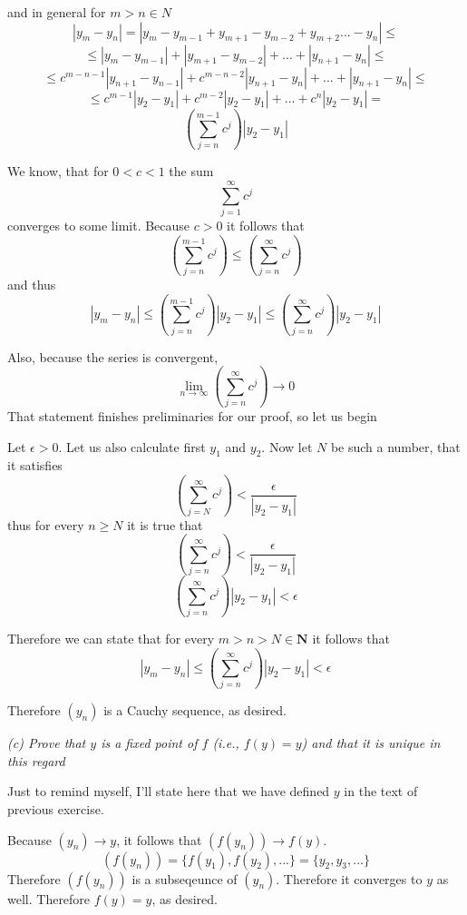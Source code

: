 \documentclass[11pt,oneside,titlepage]{book}
\begin{document}
and in general for $m > n \in N$ 
$$|y_m - y_n| = 
|y_m - y_{m - 1} + y_{m + 1} - y_{m - 2} + y_{m + 2} ...  - y_n| \leq$$
$$ \leq |y_m - y_{m - 1}| + |y_{m + 1} - y_{m - 2}| + ... +
|y_{n + 1}  - y_n| \leq $$
$$ \leq c^{m - n - 1}|y_{n + 1} - y_{n - 1}| +
c^{m - n - 2}|y_{n + 1} - y_{n}| + ... +
|y_{n + 1}  - y_n| \leq  $$
$$ \leq c^{m  - 1}|y_{2} - y_{1}| +
c^{m - 2}|y_{2} - y_{1}| + ... +
c^n|y_{2}  - y_1| =  $$
$$\left(\sum_{j = n}^{m - 1}c^j\right)|y_2 - y_1|$$

We know, that for $0 < c < 1$ the sum
$$\sum_{j = 1}^{\infty}c^j$$
converges to some limit. Because $c > 0$ it follows that
$$\left(\sum_{j = n}^{m - 1}c^j\right)
\leq
\left(\sum_{j = n}^{\infty}c^j\right)$$
and thus
$$|y_m - y_n| \leq \left(\sum_{j = n}^{m - 1}c^j\right)|y_2 - y_1|
\leq \left(\sum_{j = n}^{\infty}c^j\right) |y_2 - y_1|$$

Also, because the series is convergent, 
$$\lim_{n \to \infty} \left(\sum_{j = n}^{\infty}c^j\right) \to 0$$
That statement finishes preliminaries for our proof, so let us begin

Let $\epsilon > 0$. Let us also calculate first $y_1$ and $y_2$.
Now let $N$ be such a number, that it satisfies 
$$\left(\sum_{j = N}^{\infty}c^j\right) < \frac{\epsilon}{|y_2 - y_1|}$$
thus for every $n \geq N$ it is true that
$$\left(\sum_{j = n}^{\infty}c^j\right) < \frac{\epsilon}{|y_2 - y_1|}$$
$$\left(\sum_{j = n}^{\infty}c^j\right)|y_2 - y_1| < \epsilon$$

Therefore we can state that for every $m > n > N \in \textbf{N}$ it follows
that 
$$|y_m - y_n| \leq 
\left(\sum_{j = n}^{\infty}c^j\right)|y_2 - y_1| < \epsilon$$

Therefore $(y_n)$ is a Cauchy sequence, as desired.

\textit{(c) Prove that $y$ is a fixed point of $f$ (i.e., $f(y) = y$) and that
  it is unique in this regard}

Just to remind myself, I'll state here that we have  defined $y$ in
the text of previous exercise.

Because $(y_n) \to y$, it follows that $(f(y_n)) \to f(y)$.
$$(f(y_n)) = \{f(y_1), f(y_2), ... \} = \{y_2, y_3, ... \}$$
Therefore $(f(y_n))$ is a subseqeunce of $(y_n)$. Therefore
it converges to $y$ as well. Therefore $f(y) = y$, as desired.
\end{document}

